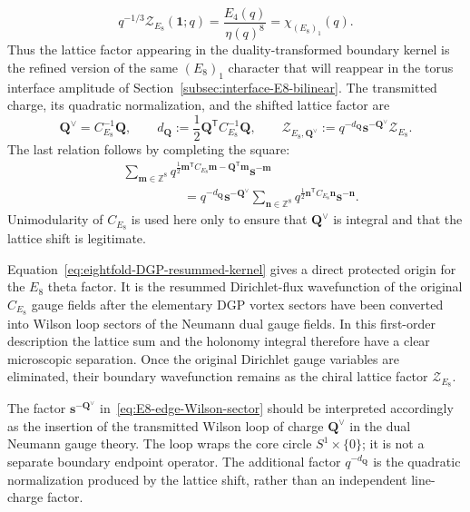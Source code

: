 \documentclass[11pt,a4paper]{article}
\numberwithin{equation}{section}
\begin{document}
\begin{equation}
  q^{-1/3}\mathcal Z_{E_8}(\boldsymbol 1;q)
  =\frac{E_4(q)}{\eta(q)^8}
  =\chi_{(E_8)_1}(q).
  \label{eq:E8-edge-unrefined-character}
\end{equation}
Thus the lattice factor appearing in the duality-transformed boundary kernel is the refined version of the same $(E_8)_1$ character that will reappear in the torus interface amplitude of Section~\ref{subsec:interface-E8-bilinear}.
The transmitted charge, its quadratic normalization, and the shifted lattice factor are
\begin{equation}
  \boldsymbol Q^\vee=C_{E_8}^{-1}\boldsymbol Q,
  \qquad
  d_{\boldsymbol Q}:=
  \frac12\boldsymbol Q^{\mathsf T}C_{E_8}^{-1}\boldsymbol Q,
  \qquad
  \mathcal Z_{E_8,\boldsymbol Q^\vee}
  :=q^{-d_{\boldsymbol Q}}
  \boldsymbol s^{-\boldsymbol Q^\vee}
  \mathcal Z_{E_8}.
  \label{eq:E8-edge-Wilson-sector}
\end{equation}
The last relation follows by completing the square:
\begin{equation}
\begin{aligned}
 &\sum_{\boldsymbol m\in\mathbb Z^8}
 q^{\frac12\boldsymbol m^{\mathsf T}C_{E_8}\boldsymbol m
 -\boldsymbol Q^{\mathsf T}\boldsymbol m}
 \boldsymbol s^{-\boldsymbol m}
 \\
 &\hspace{2cm}=
 q^{-d_{\boldsymbol Q}}
 \boldsymbol s^{-\boldsymbol Q^\vee}
 \sum_{\boldsymbol n\in\mathbb Z^8}
 q^{\frac12\boldsymbol n^{\mathsf T}C_{E_8}\boldsymbol n}
 \boldsymbol s^{-\boldsymbol n}.
  \label{eq:E8-Wilson-complete-square}
\end{aligned}
\end{equation}
Unimodularity of $C_{E_8}$ is used here only to ensure that $\boldsymbol Q^\vee$ is integral and that the lattice shift is legitimate.

Equation~\eqref{eq:eightfold-DGP-resummed-kernel} gives a direct protected origin for the $E_8$ theta factor.  It is the resummed Dirichlet-flux wavefunction of the original $C_{E_8}$ gauge fields after the elementary DGP vortex sectors have been converted into Wilson loop sectors of the Neumann dual gauge fields.  In this first-order description the lattice sum and the holonomy integral therefore have a clear microscopic separation.  Once the original Dirichlet gauge variables are eliminated, their boundary wavefunction remains as the chiral lattice factor $\mathcal Z_{E_8}$.

The factor $\boldsymbol s^{-\boldsymbol Q^\vee}$ in~\eqref{eq:E8-edge-Wilson-sector} should be interpreted accordingly as the insertion of the transmitted Wilson loop of charge $\boldsymbol Q^\vee$ in the dual Neumann gauge theory.  The loop wraps the core circle $S^1\times\{0\}$; it is not a separate boundary endpoint operator.  The additional factor $q^{-d_{\boldsymbol Q}}$ is the quadratic normalization produced by the lattice shift, rather than an independent line-charge factor.
\end{document}

